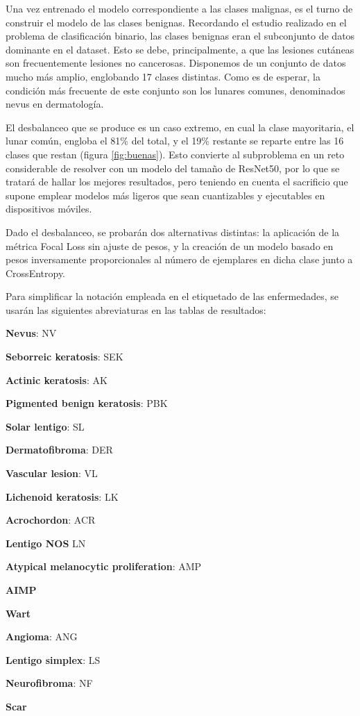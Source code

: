 Una vez entrenado el modelo correspondiente a las clases malignas, es el turno de construir el modelo de las clases benignas. Recordando el estudio realizado en el problema de clasificación binario, las clases benignas eran el subconjunto de datos dominante en el dataset. Esto se debe, principalmente, a que las lesiones cutáneas son frecuentemente lesiones no cancerosas. Disponemos de un conjunto de datos mucho más amplio, englobando 17 clases distintas.  Como es de esperar, la condición más frecuente de este conjunto son los lunares comunes, denominados nevus en dermatología.

El desbalanceo que se produce es un caso extremo, en cual la clase mayoritaria, el lunar común, engloba el 81\% del total, y el 19\% restante se reparte entre las 16 clases que restan (figura  \ref{fig:buenas}). Esto convierte al subproblema en un reto considerable de resolver con un modelo del tamaño de ResNet50, por lo que se tratará de hallar los mejores resultados, pero teniendo en cuenta el sacrificio que supone emplear modelos más ligeros que sean cuantizables y ejecutables en dispositivos móviles.

Dado el desbalanceo, se probarán dos alternativas distintas: la aplicación de la métrica Focal Loss sin ajuste de pesos, y la creación de un modelo basado en pesos inversamente proporcionales al número de ejemplares en dicha clase junto a CrossEntropy.

Para simplificar la notación empleada en el etiquetado de las enfermedades, se usarán las siguientes abreviaturas en las tablas de resultados:
\begin{multiitem}
	\item \textbf{Nevus}: NV
	\item \textbf{Seborreic keratosis}: SEK 
	\item \textbf{Actinic keratosis}: AK            
	\item \textbf{Pigmented benign keratosis}: PBK 
	\item \textbf{Solar lentigo}: SL
	\item \textbf{Dermatofibroma}: DER 
	\item \textbf{Vascular lesion}: VL                        
	\item \textbf{Lichenoid keratosis}: LK
	\item \textbf{Acrochordon}: ACR
	\item \textbf{Lentigo NOS} LN
	\item \textbf{Atypical melanocytic proliferation}: AMP
	\item \textbf{AIMP}                                  
	\item \textbf{Wart    }                                 
	\item \textbf{Angioma}: ANG                               
	\item \textbf{Lentigo simplex}: LS
	\item \textbf{Neurofibroma}: NF
	\item \textbf{Scar} 
\end{multiitem}

